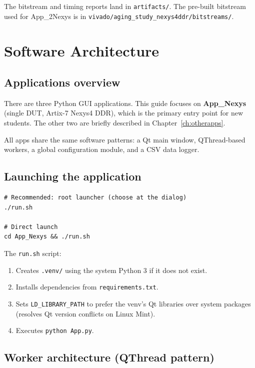 \documentclass[12pt, a4paper]{report}
\begin{document}
The bitstream and timing reports land in \texttt{artifacts/}.
The pre-built bitstream used for App\_2Nexys is in
\texttt{vivado/aging\_study\_nexys4ddr/bitstreams/}.

\chapter{Software Architecture}
\label{ch:software}

\section{Applications overview}

There are three Python GUI applications. This guide focuses on \textbf{App\_Nexys}
(single DUT, Artix-7 Nexys4 DDR), which is the primary entry point for new students.
The other two are briefly described in Chapter~\ref{ch:otherapps}.

All apps share the same software patterns: a Qt main window, QThread-based workers,
a global configuration module, and a CSV data logger.

\section{Launching the application}

\begin{lstlisting}[style=shell, caption={Running App\_Nexys}]
# Recommended: root launcher (choose at the dialog)
./run.sh

# Direct launch
cd App_Nexys && ./run.sh
\end{lstlisting}

The \texttt{run.sh} script:
\begin{enumerate}
  \item Creates \texttt{.venv/} using the system Python 3 if it does not exist.
  \item Installs dependencies from \texttt{requirements.txt}.
  \item Sets \texttt{LD\_LIBRARY\_PATH} to prefer the venv's Qt libraries over
        system packages (resolves Qt version conflicts on Linux Mint).
  \item Executes \texttt{python App.py}.
\end{enumerate}

\section{Worker architecture (QThread pattern)}
\end{document}
